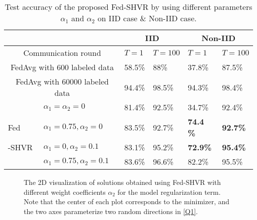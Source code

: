 \documentclass[twoside,journal]{IEEEtran}
\begin{document}
\begin{table}[t]
\centering
\caption{Test accuracy of the proposed Fed-SHVR by using different parameters $\alpha_1$ and $\alpha_2$ on IID case \& Non-IID case. }
\renewcommand\tabcolsep{2.5pt}
\begin{tabular}{|l|l|l|l|l|l|}
\hline \multicolumn{2}{|c|}{} & \multicolumn{2}{|c|}{IID} & \multicolumn{2}{|c|}{Non-IID} \\
\hline \multicolumn{2}{|c|}{Communication round} & $T=1$&$T=100$ &$T=1$&$T=100$ \\
\hline \multicolumn{2}{|c|}{FedAvg with 600 labeled data}  &58.5\%&88\% & 37.8\% &87.5\%\\
\hline \multicolumn{2}{|c|}{FedAvg with 60000 labeled data}  &94.4\%&98.5\% & 94.3\% &98.4\%\\
\hline  & $\alpha_1=\alpha_2=0$&81.4\% &92.5\% &34.7\% &92.4\% \\
\cline { 2 - 6 } Fed  & $\alpha_1=0.75,\alpha_2=0$ &83.5\%&92.7\%&\textbf{74.4 \%}&\textbf{92.7\%} \\
\cline { 2 - 6 } -SHVR& $\alpha_1=0,\alpha_2=0.1$ &83.1\%&95.2\%&\textbf{72.9\%} & \textbf{95.4\%}\\
\cline { 2 - 6 } & $\alpha_1=0.75,\alpha_2=0.1$ & 83.6\%&96.6\%&82.2\%&95.5\% \\
\hline
\end{tabular}
\label{tab: accuracy_para}
\end{table}
\begin{figure*}[t]
\centering
{}%
\hspace{-2.1cm}
%
\centering
\caption{The 2D visualization of solutions obtained using Fed-SHVR with different weight coefficients $\alpha_2$ for the model regularization term. Note that the center
of each plot corresponds to the minimizer, and the two axes parameterize two random directions in \eqref{Q1}.}
\label{landscape}
\end{figure*}
\end{document}
